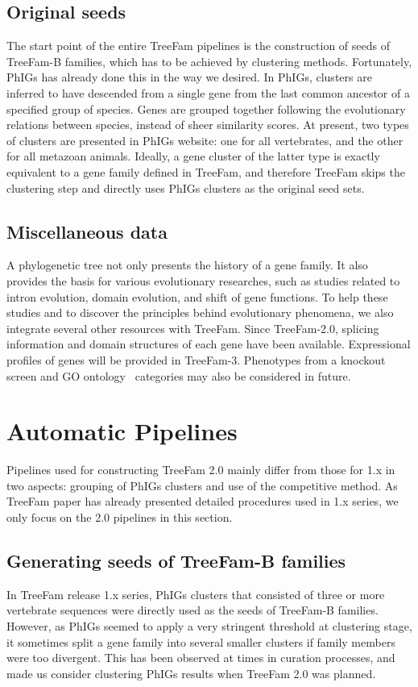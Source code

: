 \subsection{Original seeds}
The start point of the entire TreeFam pipelines is the construction of seeds of TreeFam-B families,
which has to be achieved by clustering methods. Fortunately, PhIGs has already done this
in the way we desired. In PhIGs, clusters are inferred to have descended from
a single gene from the last common ancestor of a specified group of species.
Genes are grouped together following the evolutionary relations between species, instead of
sheer similarity scores.
At present, two types of clusters are presented in PhIGs website: one for all vertebrates,
and the other for all metazoan animals. Ideally, a gene cluster of the latter type is exactly equivalent
to a gene family defined in TreeFam, and therefore TreeFam skips the clustering step
and directly uses PhIGs clusters as the original seed sets.

\subsection{Miscellaneous data}
A phylogenetic tree not only presents the history of a gene family. It also
provides the basis for various evolutionary researches, such as studies related to
intron evolution, domain evolution, and shift of gene functions. To help
these studies and to discover the principles behind evolutionary phenomena,
we also integrate several other resources with TreeFam. Since TreeFam-2.0, splicing
information and domain structures of each gene have been available.
Expressional profiles of genes will be provided in TreeFam-3. Phenotypes from
a knockout screen and GO ontology~\cite{ashburner00} categories may also be considered
in future.

\section{Automatic Pipelines}
Pipelines used for constructing TreeFam 2.0 mainly differ from those for 1.x
in two aspects: grouping of PhIGs clusters and use of the competitive method.
As TreeFam paper has already presented detailed procedures used in 1.x series,
we only focus on the 2.0 pipelines in this section.

\subsection{Generating seeds of TreeFam-B families}
In TreeFam release 1.x series, PhIGs clusters that consisted of three or more vertebrate sequences were
directly used as the seeds of TreeFam-B families. However, as PhIGs seemed to apply
a very stringent threshold at clustering stage, it sometimes split a gene family
into several smaller clusters if family members were too divergent.
This has been observed at times in curation processes, and made us
consider clustering PhIGs results when TreeFam 2.0 was planned.

